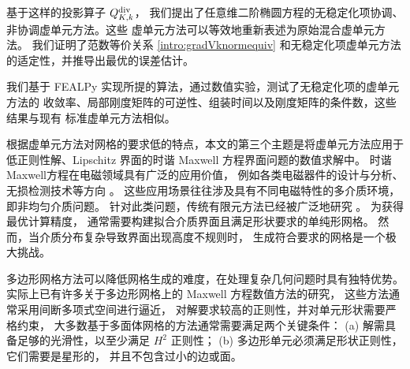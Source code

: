 基于这样的投影算子 \( Q_{K,k}^{\operatorname{div}} \)，
我们提出了任意维二阶椭圆方程的无稳定化项协调、非协调虚单元方法。这些
虚单元方法可以等效地重新表述为原始混合虚单元方法。
我们证明了范数等价关系 \eqref{intro:gradVknormequiv} 和无稳定化项虚单元方法
的适定性，并推导出最优的误差估计。

我们基于 FEALPy 实现所提的算法，通过数值实验，测试了无稳定化项的虚单元方法的
收敛率、局部刚度矩阵的可逆性、组装时间以及刚度矩阵的条件数，这些结果与现有
标准虚单元方法相似。


根据虚单元方法对网格的要求低的特点，本文的第三个主题是将虚单元方法应用于
低正则性解、Lipschitz 界面的时谐 Maxwell 方程界面问题的数值求解中。
时谐Maxwell方程在电磁领域具有广泛的应用价值，
例如各类电磁器件的设计与分析、无损检测技术等方向
\cite{2015AmmariChenChenVolkov,2020CHENLIANGZOU}。
这些应用场景往往涉及具有不同电磁特性的多介质环境，即非均匀介质问题。
针对此类问题，传统有限元方法已经被广泛地研究
\cite{2023ChenLiXiang,2014CiarletWuZou,1992Monk,
2003GopalakrishnanPasciak,2009ZhongShuWittumXu}。
为获得最优计算精度，
通常需要构建拟合介质界面且满足形状要求的单纯形网格。
然而，当介质分布复杂导致界面出现高度不规则时，
生成符合要求的网格是一个极大挑战。

多边形网格方法可以降低网格生成的难度，在处理复杂几何问题时具有独特优势。实际上已有许多关于多边形网格上的
Maxwell
方程数值方法的研究\cite{2017ChenQiuShiSolana,2020DuSayasSIAM,2008HermelineLayouniOmnes,2015KretzschmarMoiolaPerugia,2015ChenWang,2004CockburnLiShu}，
这些方法通常采用间断多项式空间进行逼近，
对解要求较高的正则性，并对单元形状需要严格约束，
大多数基于多面体网格的方法通常需要满足两个关键条件：
(a) 解需具备足够的光滑性，以至少满足 $H^2$ 正则性；
(b) 多边形单元必须满足形状正则性，它们需要是星形的，
        并且不包含过小的边或面。

